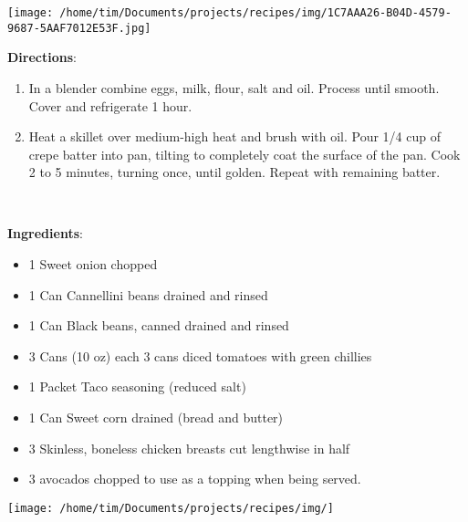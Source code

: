 \documentclass[11pt, twoside, openany]{book}
\begin{document}
\begin{minipage}[t]{0.2\linewidth}
\centering \strut\vspace*{-\baselineskip}\newline
\texttt{[image: /home/tim/Documents/projects/recipes/img/1C7AAA26-B04D-4579-9687-5AAF7012E53F.jpg]}\\
\end{minipage}\vspace{3mm}
\textbf{Directions}:
\vspace{-3mm}\begin{enumerate}\setlength\itemsep{-1mm}
\item In a blender combine eggs, milk, flour, salt and oil. Process until smooth. Cover and refrigerate 1 hour.
\item Heat a skillet over medium-high heat and brush with oil. Pour 1/4 cup of crepe batter into pan, tilting to completely coat the surface of the pan. Cook 2 to 5 minutes, turning once, until golden. Repeat with remaining batter.
\end{enumerate}
 \label{chicken-taco-stew-crock-pot}\hfill\textit{}\\
\begin{minipage}[t]{0.8\linewidth}
\textbf{Ingredients}:\vspace{-3mm}
\begin{multicols}{2}
\begin{itemize}\setlength\itemsep{-1mm}
\item 1 Sweet onion chopped
\item 1 Can Cannellini beans drained and rinsed
\item 1 Can Black beans, canned drained and rinsed
\item 3 Cans (10 oz) each 3 cans diced tomatoes with green chillies
\item 1 Packet Taco seasoning (reduced salt)
\item 1 Can Sweet corn drained (bread and butter)
\item 3 Skinless, boneless chicken breasts cut lengthwise in half
\item 3 avocados chopped to use as a topping when being served.
\end{itemize}
\end{multicols}
\end{minipage}
\begin{minipage}[t]{0.2\linewidth}
\centering \strut\vspace*{-\baselineskip}\newline
\texttt{[image: /home/tim/Documents/projects/recipes/img/]}\\
\end{minipage}\vspace{3mm}
\end{document}
